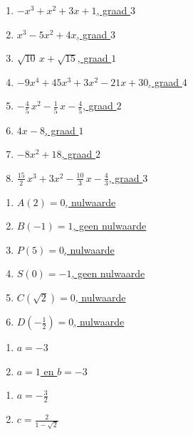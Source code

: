 \documentclass{ximera}
\begin{document}
\begin{oplossing} 
\begin{enumerate}
\item
\hyperlink{oef1.7}{$-x^3+x^2+3x+1$, graad $3$}
\item
\hyperlink{oef1.7}{$x^3-5x^2+4x$, graad $3$}
\item
\hyperlink{oef1.7}{$\sqrt{10}\,x+\sqrt{15}$, graad $1$}
\item
\hyperlink{oef1.7}{$-9x^4+45x^3+3x^2-21x+30$, graad $4$}
\item
\hyperlink{oef1.7}{$-\frac{4}{5}\,x^2-\frac{1}{5}\,x-\frac{4}{5}$, graad $2$}
\item
\hyperlink{oef1.7}{$4x-8$, graad $1$}
\item
\hyperlink{oef1.7}{$-8x^2+18$, graad $2$}
\item
\hyperlink{oef1.7}{$\frac{15}{2}\,x^3 + 3x^2 - \frac{10}{3}\,x-\frac{4}{3}$, graad $3$}
\end{enumerate}
\end{oplossing} 

\begin{oplossing} 
\begin{enumerate}
\item
\hyperlink{oef1.8}{$A(2)=0$, nulwaarde}
\item
\hyperlink{oef1.8}{$B(-1)=1$, geen nulwaarde}
\item
\hyperlink{oef1.8}{$P(5)=0$, nulwaarde}
\item
\hyperlink{oef1.8}{$S(0)=-1$, geen nulwaarde}
\item
\hyperlink{oef1.8}{$C(\sqrt{2})=0$, nulwaarde}
\item
\hyperlink{oef1.8}{$D\left(-\frac{1}{2}\right)=0$, nulwaarde}
\end{enumerate}
\end{oplossing} 

\begin{oplossing} 
\begin{enumerate}
\item
\hyperlink{oef1.9}{$a=-3$}
\item
\hyperlink{oef1.9}{$a = 1$ en $b = -3$}
\end{enumerate}
\end{oplossing} 

\begin{oplossing} 
\begin{enumerate}
\item
\hyperlink{oef1.10}{$a = -\frac{3}{2}$}
\item
\hyperlink{oef1.10}{$c = \frac{2}{1-\sqrt{2}}$}
\end{enumerate}
\end{oplossing} 
\end{document}
